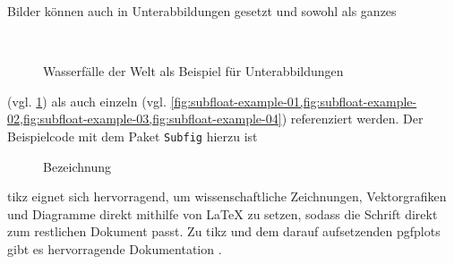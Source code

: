 Bilder können auch in
Unterabbildungen gesetzt
und sowohl als ganzes
\begin{figure}[tbp]\centering
{} \qquad
{} \\
 \qquad
{}
\caption{Wasserfälle der Welt als Beispiel für Unterabbildungen}
\label{fig:subfloat-example}
\end{figure}
(vgl. \cref{fig:subfloat-example}) als auch einzeln (vgl.
\cref{fig:subfloat-example-01,fig:subfloat-example-02,fig:subfloat-example-03,fig:subfloat-example-04})
referenziert werden. Der Beispielcode mit dem Paket \texttt{Subfig}
\parencite{Cochran2005} hierzu ist
\begin{latex}[caption={Unterabbildungen in LaTeX},label={lst:subfigures}]
\begin{figure}
\centering
{} \qquad
{}
\caption{Bezeichnung}
\label{fig:my-whole-figure}
\end{figure}
\end{latex}

\Gls{tikz} eignet sich hervorragend, um wissenschaftliche Zeichnungen, Vektorgrafiken
und Diagramme direkt mithilfe von LaTeX zu setzen, sodass die Schrift direkt zum
restlichen Dokument passt. Zu \gls{tikz} und dem darauf aufsetzenden \gls{pgfplots} gibt
es hervorragende Dokumentation \parencites{Tantau2013}{Feuersaenger2014}.


